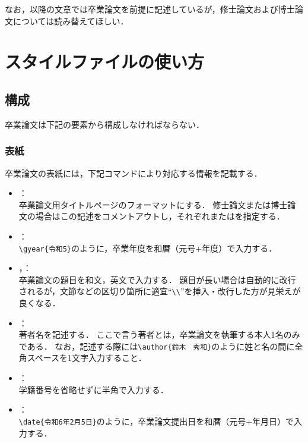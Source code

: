 \documentclass[a4j,11pt]{ujreport}
\begin{document}
なお，以降の文章では卒業論文を前提に記述しているが，修士論文および博士論文については読み替えてほしい．


\chapter{スタイルファイルの使い方}\label{chap:HowTo}

\section{構成}
\label{sec:Structure}

卒業論文は下記の要素から構成しなければならない．

\subsection{表紙}
\label{subsec:TitlePage}
卒業論文の表紙には，下記コマンドにより対応する情報を記載する．

\begin{itemize}
\item {}：\mbox{}\\
卒業論文用タイトルページのフォーマットにする．
修士論文または博士論文の場合はこの記述をコメントアウトし，それぞれまたはを指定する．

\item {}：\mbox{}\\
\verb|\gyear{令和5}|のように，卒業年度を和暦（元号+年度）で入力する．

\item {}，：\mbox{}\\
卒業論文の題目を和文，英文で入力する．
題目が長い場合は自動的に改行されるが，文節などの区切り箇所に適宜``\verb|\\|''を挿入・改行した方が見栄えが良くなる．

\item {}：\mbox{}\\
著者名を記述する．
ここで言う著者とは，卒業論文を執筆する本人1名のみである．
なお，記述する際には\verb|\author{鈴木　秀和}|のように姓と名の間に全角スペースを1文字入力すること．

\item {}：\mbox{}\\
学籍番号を省略せずに半角で入力する．

\item {}：\mbox{}\\
\verb|\date{令和6年2月5日}|のように，卒業論文提出日を和暦（元号+年月日）で入力する．
\end{itemize}
\end{document}
